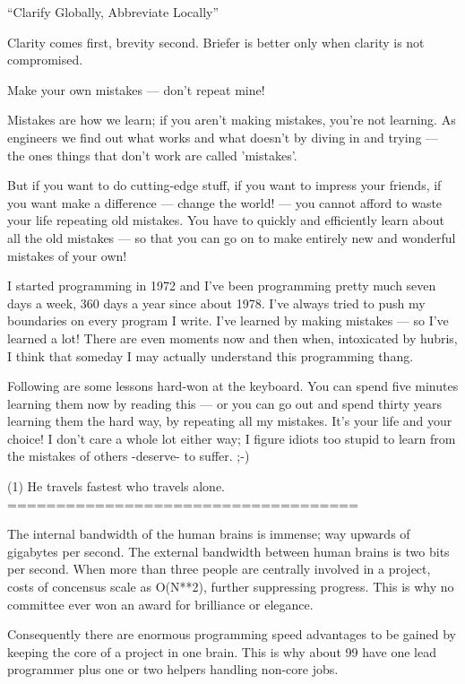 ``Clarify Globally, Abbreviate Locally''

Clarity comes first, brevity second.  Briefer is better only when clarity is not compromised.





Make your own mistakes --- don't repeat mine!

Mistakes are how we learn;  if you aren't making mistakes, you're not learning.
As engineers we find out what works and what doesn't by diving in and trying --- 
the ones things that don't work are called 'mistakes'.

But if you want to do cutting-edge stuff, if you want to impress your friends,
if you want make a difference --- change the world! --- you cannot afford to 
waste your life repeating old mistakes.  You have to quickly and efficiently 
learn about all the old mistakes --- so that you can go on to make entirely new 
and wonderful mistakes of your own!

I started programming in 1972 and I've been programming pretty much seven days a week, 
360 days a year since about 1978.  I've always tried to push my boundaries on every 
program I write.  I've learned by making mistakes --- so I've learned a lot!  There 
are even moments now and then when, intoxicated by hubris, I think that someday I may 
actually understand this programming thang.

Following are some lessons hard-won at the keyboard.  You can spend five minutes 
learning them now by reading this --- or you can go out and spend thirty years learning 
them the hard way, by repeating all my mistakes.  It's your life and your choice!  I 
don't care a whole lot either way;  I figure idiots too stupid to learn from the mistakes 
of others -deserve- to suffer. ;-)


(1) He travels fastest who travels alone.
    ====================================

    The internal bandwidth of the human brains is immense; way upwards of gigabytes 
    per second.  The external bandwidth between human brains is two bits per second. 
    When more than three people are centrally involved in a project, costs of concensus 
    scale as O(N**2), further suppressing progress.  This is why no committee ever 
    won an award for brilliance or elegance. 

    Consequently there are enormous programming speed advantages to be gained by keeping 
    the core of a project in one brain.  This is why about 99%
    have one lead programmer plus one or two helpers handling non-core jobs. 



